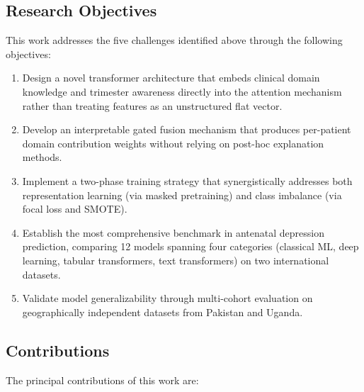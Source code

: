 \documentclass[12pt,a4paper]{article}
\begin{document}
\subsection{Research Objectives}

This work addresses the five challenges identified above through the following objectives:

\begin{enumerate}
    \item Design a novel transformer architecture that embeds clinical domain knowledge and trimester awareness directly into the attention mechanism rather than treating features as an unstructured flat vector.
    \item Develop an interpretable gated fusion mechanism that produces per-patient domain contribution weights without relying on post-hoc explanation methods.
    \item Implement a two-phase training strategy that synergistically addresses both representation learning (via masked pretraining) and class imbalance (via focal loss and SMOTE).
    \item Establish the most comprehensive benchmark in antenatal depression prediction, comparing 12 models spanning four categories (classical ML, deep learning, tabular transformers, text transformers) on two international datasets.
    \item Validate model generalizability through multi-cohort evaluation on geographically independent datasets from Pakistan and Uganda.
\end{enumerate}

\subsection{Contributions}

The principal contributions of this work are:
\end{document}
